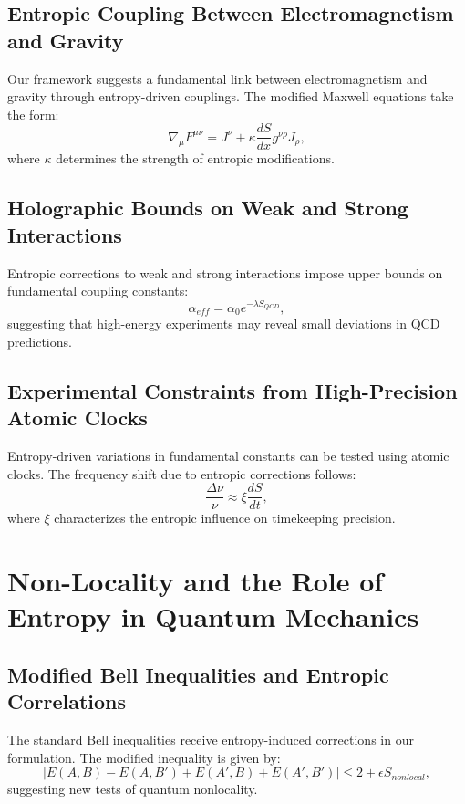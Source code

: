 \documentclass{article}
\begin{document}
\subsection{Entropic Coupling Between Electromagnetism and Gravity}
Our framework suggests a fundamental link between electromagnetism and gravity through entropy-driven couplings. The modified Maxwell equations take the form:
\begin{equation}
\nabla_\mu F^{\mu\nu} = J^\nu + \kappa \frac{dS}{dx} g^{\nu\rho} J_\rho,
\end{equation}
where $\kappa$ determines the strength of entropic modifications.

\subsection{Holographic Bounds on Weak and Strong Interactions}
Entropic corrections to weak and strong interactions impose upper bounds on fundamental coupling constants:
\begin{equation}
\alpha_{eff} = \alpha_0 e^{-\lambda S_{QCD}},
\end{equation}
suggesting that high-energy experiments may reveal small deviations in QCD predictions.

\subsection{Experimental Constraints from High-Precision Atomic Clocks}
Entropy-driven variations in fundamental constants can be tested using atomic clocks. The frequency shift due to entropic corrections follows:
\begin{equation}
\frac{\Delta \nu}{\nu} \approx \xi \frac{dS}{dt},
\end{equation}
where $\xi$ characterizes the entropic influence on timekeeping precision.

\section{Non-Locality and the Role of Entropy in Quantum Mechanics}

\subsection{Modified Bell Inequalities and Entropic Correlations}
The standard Bell inequalities receive entropy-induced corrections in our formulation. The modified inequality is given by:
\begin{equation}
|E(A, B) - E(A, B') + E(A', B) + E(A', B')| \leq 2 + \epsilon S_{nonlocal},
\end{equation}
suggesting new tests of quantum nonlocality.
\end{document}
